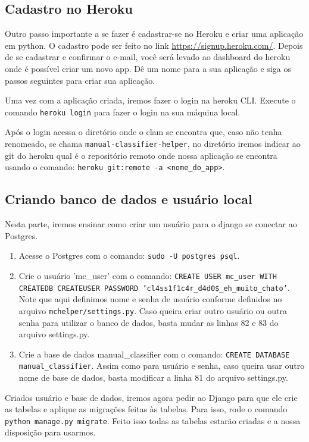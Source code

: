 \subsection{Cadastro no Heroku}

Outro passo importante a se fazer é cadastrar-se no Heroku e criar uma aplicação em python. O cadastro
pode ser feito no link \url{https://signup.heroku.com/}. Depois de se cadastrar e confirmar o e-mail,
você será levado ao dashboard do heroku onde é possível criar um novo app. Dê um nome para a sua 
aplicação e siga os passos seguintes para criar sua aplicação.

Uma vez com a aplicação criada, iremos fazer o login na heroku CLI. Execute o comando \texttt{heroku login} para fazer o login na sua máquina local.

Após o login acessa o diretório onde o clam se encontra que, caso não tenha renomeado, se chama
\texttt{manual-classifier-helper}, no diretório iremos indicar ao git do heroku qual é o repositório
remoto onde nossa aplicação se encontra usando o comando: \texttt{heroku git:remote -a <nome_do_app>}.

\subsection{Criando banco de dados e usuário local}
\label{subsec:database}

Nesta parte, iremos ensinar como criar um usuário para o django se conectar ao Postgres.

\begin{enumerate}
	\item Acesse o Postgres com o comando: \texttt{sudo -U postgres psql}.
	\item Crie o usuário 'mc_user' com o comando: \texttt{CREATE USER mc_user WITH CREATEDB CREATEUSER PASSWORD 'cl4ss1f1c4r_d4d0\$_eh_muito_chato'}. Note que aqui definimos nome e senha de usuário conforme
	definidos no arquivo \texttt{mchelper/settings.py}. Caso queira criar outro usuário ou outra senha
	para utilizar o banco de dados, basta mudar as linhas 82 e 83 do arquivo settings.py.
	\item Crie a base de dados manual_classifier com o comando: \texttt{CREATE DATABASE manual_classifier}.
	Assim como para usuário e senha, caso queira usar outro nome de base de dados, basta
	modificar a linha 81 do arquivo settings.py.
\end{enumerate}

Criados usuário e base de dados, iremos agora pedir ao Django para que ele crie as tabelas e
aplique as migrações feitas às tabelas. Para isso, rode o comando \texttt{python manage.py migrate}.
Feito isso todas as tabelas estarão criadas e a nossa disposição para usarmos.


